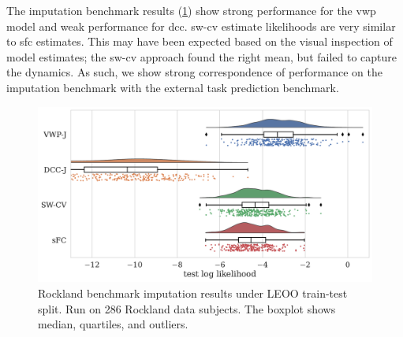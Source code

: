 The imputation benchmark results (\cref{fig:rockland-results-imputation-benchmark}) show strong performance for the \gls{vwp} model and weak performance for \gls{dcc}.
\gls{sw-cv} estimate likelihoods are very similar to \gls{sfc} estimates.
This may have been expected based on the visual inspection of model estimates; the \gls{sw-cv} approach found the right mean, but failed to capture the dynamics.
%
As such, we show strong correspondence of performance on the imputation benchmark with the external task prediction benchmark.


\begin{figure}[ht]
  \centering
  \includegraphics[width=\textwidth]{fig/rockland/CHECKERBOARD645/imputation_study/LEOO_test_log_likelihoods_raincloud}
  \caption{
    Rockland benchmark imputation results under LEOO train-test split.
    Run on 286 Rockland data subjects.
    The boxplot shows median, quartiles, and outliers.
  }
  \label{fig:rockland-results-imputation-benchmark}
\end{figure}

